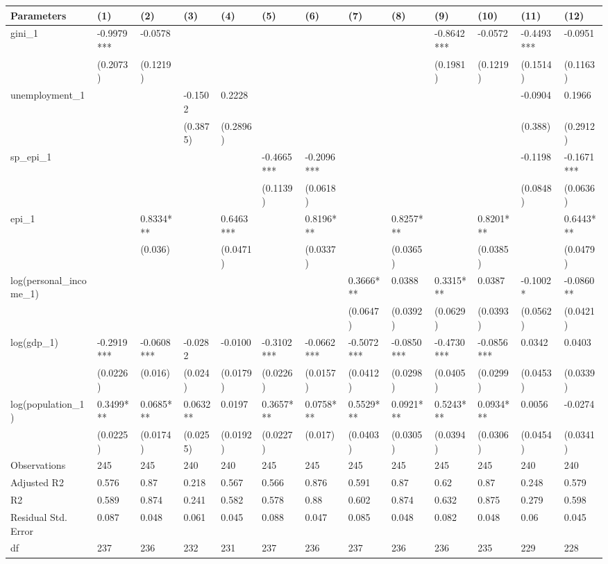 
\begin{tabular}{l|l|l|l|l|l|l|l|l|l|l|l|l}
\hline
Parameters & (1) & (2) & (3) & (4) & (5) & (6) & (7) & (8) & (9) & (10) & (11) & (12)\\
\hline
gini\_1 & -0.9979*** & -0.0578 &  &  &  &  &  &  & -0.8642*** & -0.0572 & -0.4493*** & -0.0951\\
\hline
 & (0.2073) & (0.1219) &  &  &  &  &  &  & (0.1981) & (0.1219) & (0.1514) & (0.1163)\\
\hline
unemployment\_1 &  &  & -0.1502 & 0.2228 &  &  &  &  &  &  & -0.0904 & 0.1966\\
\hline
 &  &  & (0.3875) & (0.2896) &  &  &  &  &  &  & (0.388) & (0.2912)\\
\hline
sp\_epi\_1 &  &  &  &  & -0.4665*** & -0.2096*** &  &  &  &  & -0.1198 & -0.1671***\\
\hline
 &  &  &  &  & (0.1139) & (0.0618) &  &  &  &  & (0.0848) & (0.0636)\\
\hline
epi\_1 &  & 0.8334*** &  & 0.6463*** &  & 0.8196*** &  & 0.8257*** &  & 0.8201*** &  & 0.6443***\\
\hline
 &  & (0.036) &  & (0.0471) &  & (0.0337) &  & (0.0365) &  & (0.0385) &  & (0.0479)\\
\hline
log(personal\_income\_1) &  &  &  &  &  &  & 0.3666*** & 0.0388 & 0.3315*** & 0.0387 & -0.1002* & -0.0860**\\
\hline
 &  &  &  &  &  &  & (0.0647) & (0.0392) & (0.0629) & (0.0393) & (0.0562) & (0.0421)\\
\hline
log(gdp\_1) & -0.2919*** & -0.0608*** & -0.0282 & -0.0100 & -0.3102*** & -0.0662*** & -0.5072*** & -0.0850*** & -0.4730*** & -0.0856*** & 0.0342 & 0.0403\\
\hline
 & (0.0226) & (0.016) & (0.024) & (0.0179) & (0.0226) & (0.0157) & (0.0412) & (0.0298) & (0.0405) & (0.0299) & (0.0453) & (0.0339)\\
\hline
log(population\_1) & 0.3499*** & 0.0685*** & 0.0632** & 0.0197 & 0.3657*** & 0.0758*** & 0.5529*** & 0.0921*** & 0.5243*** & 0.0934*** & 0.0056 & -0.0274\\
\hline
 & (0.0225) & (0.0174) & (0.0255) & (0.0192) & (0.0227) & (0.017) & (0.0403) & (0.0305) & (0.0394) & (0.0306) & (0.0454) & (0.0341)\\
\hline
Observations & 245 & 245 & 240 & 240 & 245 & 245 & 245 & 245 & 245 & 245 & 240 & 240\\
\hline
Adjusted R2 & 0.576 & 0.87 & 0.218 & 0.567 & 0.566 & 0.876 & 0.591 & 0.87 & 0.62 & 0.87 & 0.248 & 0.579\\
\hline
R2 & 0.589 & 0.874 & 0.241 & 0.582 & 0.578 & 0.88 & 0.602 & 0.874 & 0.632 & 0.875 & 0.279 & 0.598\\
\hline
Residual Std. Error & 0.087 & 0.048 & 0.061 & 0.045 & 0.088 & 0.047 & 0.085 & 0.048 & 0.082 & 0.048 & 0.06 & 0.045\\
\hline
df & 237 & 236 & 232 & 231 & 237 & 236 & 237 & 236 & 236 & 235 & 229 & 228\\
\hline
\end{tabular}
